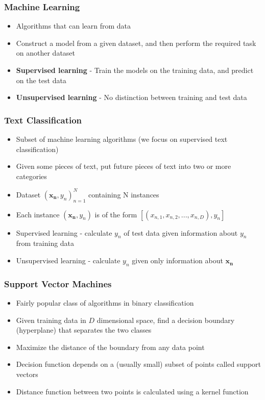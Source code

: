 \documentclass{beamer}
\begin{document}
    \begin{frame}
        \frametitle{Machine Learning}
        \begin{itemize}
            \item{Algorithms that can learn from data}
            \item{Construct a model from a given dataset, and then perform the required task on another dataset}
            \item{\textbf{Supervised learning} - Train the models on the training data, and predict on the test data}
            \item{\textbf{Unsupervised learning} - No distinction between training and test data}
        \end{itemize}
    \end{frame}
    
    \begin{frame}
        \frametitle{Text Classification}
        \begin{itemize}
            \item{Subset of machine learning algorithms (we focus on supervised text classification)}
            \item{Given some pieces of text, put future pieces of text into two or more categories}
            \item{Dataset ${(\mathbf{x_n}, y_n)}_{n = 1}^{N}$ containing N instances}
            \item{Each instance $(\mathbf{x_n}, y_n)$ is of the form $[(x_{n, 1}, x_{n, 2}, ..., x_{n, D}), y_n]$}
            \item{Supervised learning - calculate $y_n$ of test data given information about $y_n$ from training data}
            \item{Unsupervised learning - calculate $y_n$ given only information about $\mathbf{x_n}$}
        \end{itemize}
    \end{frame}
    
    \begin{frame}
        \frametitle{Support Vector Machines}
        \begin{itemize}
            \item{Fairly popular class of algorithms in binary classification}
            \item{Given training data in $D$ dimensional space, find a decision boundary (hyperplane) that separates the two classes}
            \item{Maximize the distance of the boundary from any data point}
            \item{Decision function depends on a (usually small) subset of points called support vectors}
            \item{Distance function between two points is calculated using a kernel function}
        \end{itemize}
    \end{frame}
    
\end{document}
